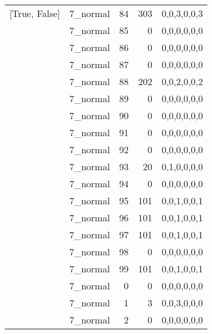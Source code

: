\begin{tabular}{llrrl}
 [True, False]   & 7\_normal            &            84 &                   303 & 0,0,3,0,0,3   \\
 [True, False]   & 7\_normal            &            85 &                     0 & 0,0,0,0,0,0   \\
 [True, False]   & 7\_normal            &            86 &                     0 & 0,0,0,0,0,0   \\
 [True, False]   & 7\_normal            &            87 &                     0 & 0,0,0,0,0,0   \\
 [True, False]   & 7\_normal            &            88 &                   202 & 0,0,2,0,0,2   \\
 [True, False]   & 7\_normal            &            89 &                     0 & 0,0,0,0,0,0   \\
 [True, False]   & 7\_normal            &            90 &                     0 & 0,0,0,0,0,0   \\
 [True, False]   & 7\_normal            &            91 &                     0 & 0,0,0,0,0,0   \\
 [True, False]   & 7\_normal            &            92 &                     0 & 0,0,0,0,0,0   \\
 [True, False]   & 7\_normal            &            93 &                    20 & 0,1,0,0,0,0   \\
 [True, False]   & 7\_normal            &            94 &                     0 & 0,0,0,0,0,0   \\
 [True, False]   & 7\_normal            &            95 &                   101 & 0,0,1,0,0,1   \\
 [True, False]   & 7\_normal            &            96 &                   101 & 0,0,1,0,0,1   \\
 [True, False]   & 7\_normal            &            97 &                   101 & 0,0,1,0,0,1   \\
 [True, False]   & 7\_normal            &            98 &                     0 & 0,0,0,0,0,0   \\
 [True, False]   & 7\_normal            &            99 &                   101 & 0,0,1,0,0,1   \\
 [True, False]   & 7\_normal            &             0 &                     0 & 0,0,0,0,0,0   \\
 [True, False]   & 7\_normal            &             1 &                     3 & 0,0,3,0,0,0   \\
 [True, False]   & 7\_normal            &             2 &                     0 & 0,0,0,0,0,0   \\

\end{tabular}
